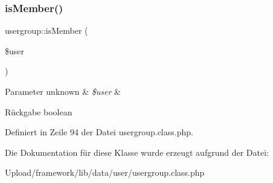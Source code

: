 \mbox{\label{classusergroup_a36cb5091e683ea89dda2dbc4f17a2cbe}} 
\subsubsection{\texorpdfstring{is\+Member()}{isMember()}}
{\footnotesize\ttfamily usergroup\+::is\+Member (\begin{DoxyParamCaption}\item[{}]{\$user }\end{DoxyParamCaption})}


\begin{DoxyParams}[1]{Parameter}
unknown & {\em \$user} & \\
\hline
\end{DoxyParams}
\begin{DoxyReturn}{Rückgabe}
boolean 
\end{DoxyReturn}


Definiert in Zeile 94 der Datei usergroup.\+class.\+php.



Die Dokumentation für diese Klasse wurde erzeugt aufgrund der Datei\+:\begin{DoxyCompactItemize}
\item 
Upload/framework/lib/data/user/usergroup.\+class.\+php\end{DoxyCompactItemize}
